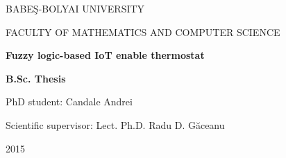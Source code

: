 \documentclass[a4paper, 12pt, english]{report}
\begin{document}
\begin{titlepage}
\sloppy
\begin{center}
\Large{BABE\c{S}-BOLYAI UNIVERSITY}

\Large{FACULTY OF MATHEMATICS AND COMPUTER SCIENCE}



\vspace{8cm}
\Huge \textbf{Fuzzy logic-based IoT enable thermostat}

\vspace{1.3cm}
\Large \textbf{B.Sc. Thesis}
\end{center}
\vspace{4cm}
\begin{flushright}
\Large{PhD student: Candale Andrei}

\Large{Scientific supervisor: Lect. Ph.D. Radu D. G\u{a}ceanu}

\end{flushright}

\vspace{2cm}

\begin{center}
\Large{2015}
\end{center}

\end{titlepage}




\tableofcontents
\listoffigures
\listoftables















\renewcommand\bibname{Bibliography}

%
%


\end{document}
